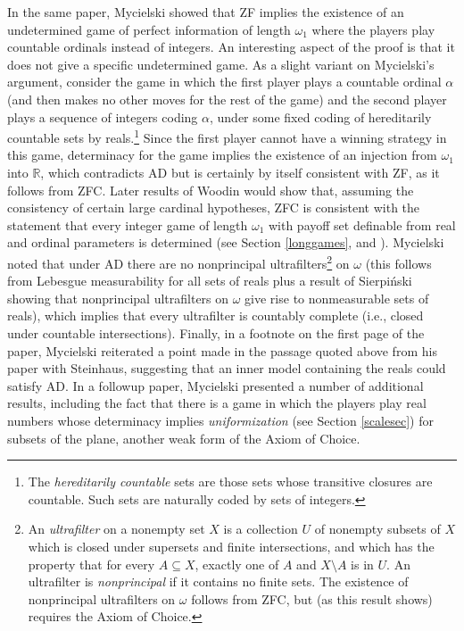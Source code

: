 \documentclass{book}%
\begin{document}
In the same paper, Mycielski showed that ZF implies the existence of an
undetermined game of perfect information of length $\omega_{1}$
where the players play countable ordinals instead of integers. An
interesting aspect of the proof is that it does not give a specific
undetermined game. As a slight variant on Mycielski's argument, consider the game in which the first
player plays a countable ordinal $\alpha$ (and then makes no other
moves for the rest of the game) and the second player plays a
sequence of integers coding $\alpha$, under some fixed coding of
hereditarily countable sets by reals.\footnote{The \emph{hereditarily countable} sets
are those sets whose transitive closures are countable. Such sets are naturally coded by
sets of integers.} Since the first player cannot
have a winning strategy in this game, determinacy for the game
implies the existence of an injection from $\omega_{1}$ into
$\mathbb{R}$, which contradicts AD but is certainly by itself
consistent with ZF, as it follows from ZFC. Later results of Woodin would
show that, assuming the consistency of certain large cardinal hypotheses, ZFC is consistent with the
statement that every integer game of length $\omega_{1}$ with payoff set definable from real
and ordinal
parameters is determined (see Section \ref{longgames}, and \cite[p.~298]{Neeman:DLG}). Mycielski noted that under AD there are no nonprincipal ultrafilters\footnote{An
\emph{ultrafilter} on a nonempty set $X$ is a
collection $U$ of nonempty subsets of $X$ which is closed under
supersets and finite intersections, and which has the property that
for every $A \subseteq X$, exactly one of $A$ and $X \setminus A$ is
in $U$. An ultrafilter is \emph{nonprincipal}
if it contains no finite sets. The existence of
nonprincipal ultrafilters on $\omega$ follows from ZFC, but (as this
result shows) requires the Axiom of Choice.} on $\omega$ (this
follows from Lebesgue measurability for all sets of reals plus a
result of Sierpi\'{n}ski  showing that
nonprincipal ultrafilters on $\omega$ give rise to nonmeasurable
sets of reals), which implies that every ultrafilter is countably
complete (i.e., closed under countable intersections). Finally, in a footnote on the first page of the paper,
Mycielski reiterated a point made in the passage quoted above from his paper with Steinhaus, suggesting
that an inner model
containing the reals could satisfy AD. In a followup paper, Mycielski 
presented a number of additional results, including the fact that there is a game
in which the players play real numbers whose determinacy implies
\emph{uniformization} (see Section \ref{scalesec}) for subsets of the plane, another weak form of the Axiom of Choice.
\end{document}
